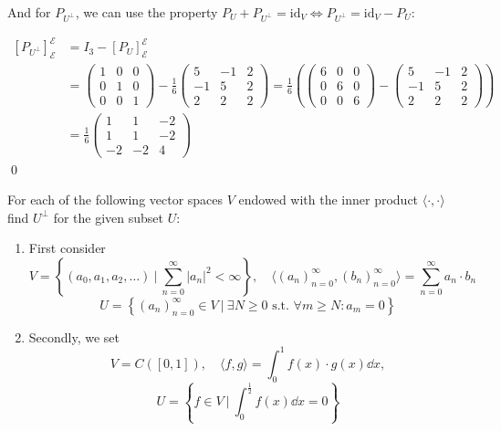 \documentclass[12pt]{article}
\begin{document}
\begin{enumerate}[label=\alph*)]
    And for $P_{U^\perp}$, we can use the property $P_U + P_{U^\perp} = \mathrm{id}_V \iff P_{U^\perp} = \mathrm{id}_V - P_U$: 


    $$
    \begin{aligned}
        [P_{U^\perp}]_{\mathcal{E}}^{\mathcal{E}} &= I_3  - [P_U]_{\mathcal{E}}^{\mathcal{E}} \\
        &= \begin{pmatrix}
            1 & 0 & 0 \\
            0 & 1 & 0 \\
            0 & 0 & 1
        \end{pmatrix} - \frac{1}{6}
        \begin{pmatrix}
            5 & -1 & 2 \\
            -1 & 5 & 2 \\
            2 & 2 & 2
        \end{pmatrix}
        = \frac{1}{6} \left( \begin{pmatrix}
            6 & 0 & 0 \\
            0 & 6 & 0 \\
            0 & 0 & 6
        \end{pmatrix} - 
        \begin{pmatrix}
            5 & -1 & 2 \\
            -1 & 5 & 2 \\
            2 & 2 & 2
        \end{pmatrix} \right) \\
        &= \boxed{\frac{1}{6}
        \begin{pmatrix}
            1 & 1 & -2 \\
            1 & 1 & -2 \\
            -2 & -2 & 4
        \end{pmatrix}}
    \end{aligned}
    $$ \qed
\end{enumerate}

\begin{problem}{}{}
    For each of the following vector spaces $V$ endowed with the inner product $\langle \cdot, \cdot \rangle$ find $U^\perp$ for the given subset $U$:
    \begin{enumerate}[label=\alph*)]
        \item First consider
        $$
            V = \left\{ (a_0,a_1,a_2,\dots)\ \big|\ \sum_{n = 0}^{\infty} |a_n|^2 < \infty \right\}, \quad \langle (a_n)_{n = 0}^{\infty}, (b_n)_{n = 0}^{\infty} \rangle = \sum_{n = 0}^{\infty} a_n \cdot b_n
        $$
        $$
            U = \left\{ (a_n)_{n = 0}^{\infty} \in V \ \big|\ \exists N \geq 0 \text{ s.t. } \forall m \geq N : a_m = 0 \right\}
        $$

        \item Secondly, we set
        $$
            V = C([0, 1]),\quad \langle f, g \rangle = \int_{0}^{1} f(x) \cdot g(x) \dd x,
        $$
        $$
            U = \left\{ f \in V \ \big|\ \int_{0}^{\frac{1}{2}} f(x) \dd x = 0 \right\}
        $$
    \end{enumerate}
\end{problem}
\end{document}
